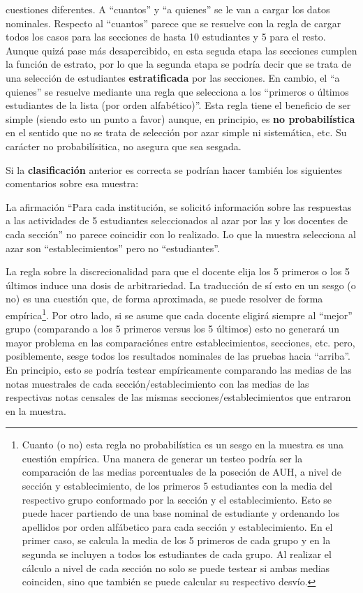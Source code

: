 \documentclass[
  spanish,
  a4paper,
]{scrreprt}
\begin{document}
\begin{itemize}
  cuestiones diferentes. A ``cuantos'' y ``a quienes'' se le van a
  cargar los datos nominales. Respecto al ``cuantos'' parece que se
  resuelve con la regla de cargar todos los casos para las secciones de
  hasta 10 estudiantes y 5 para el resto. Aunque quizá pase más
  desapercibido, en esta seguda etapa las secciones cumplen la función
  de estrato, por lo que la segunda etapa se podría decir que se trata
  de una selección de estudiantes \textbf{estratificada} por las
  secciones. En cambio, el ``a quienes'' se resuelve mediante una regla
  que selecciona a los ``primeros o últimos estudiantes de la lista (por
  orden alfabético)''. Esta regla tiene el beneficio de ser simple
  (siendo esto un punto a favor) aunque, en principio, es \textbf{no
  probabilística} en el sentido que no se trata de selección por azar
  simple ni sistemática, etc. Su carácter no probabilísitica, no asegura
  que sea sesgada.
\end{itemize}

\noindent Si la \textbf{clasificación} anterior es correcta se podrían
hacer también los siguientes comentarios sobre esa muestra:

La afirmación ``Para cada institución, se solicitó información sobre las
respuestas a las actividades de 5 estudiantes seleccionados al azar por
las y los docentes de cada sección'' no parece coincidir con lo
realizado. Lo que la muestra selecciona al azar son ``establecimientos''
pero no ``estudiantes''.

La regla sobre la discrecionalidad para que el docente elija los 5
primeros o los 5 últimos induce una dosis de arbitrariedad. La
traducción de sí esto en un sesgo (o no) es una cuestión que, de forma
aproximada, se puede resolver de forma empírica\footnote{Cuanto (o no)
  esta regla no probabilística es un sesgo en la muestra es una cuestión
  empírica. Una manera de generar un testeo podría ser la comparación de
  las medias porcentuales de la poseción de AUH, a nivel de sección y
  establecimiento, de los primeros 5 estudiantes con la media del
  respectivo grupo conformado por la sección y el establecimiento. Esto
  se puede hacer partiendo de una base nominal de estudiante y ordenando
  los apellidos por orden alfábetico para cada sección y
  establecimiento. En el primer caso, se calcula la media de los 5
  primeros de cada grupo y en la segunda se incluyen a todos los
  estudiantes de cada grupo. Al realizar el cálculo a nivel de cada
  sección no solo se puede testear si ambas medias coinciden, sino que
  también se puede calcular su respectivo desvío.}. Por otro lado, si se
asume que cada docente eligirá siempre al ``mejor'' grupo (comparando a
los 5 primeros versus los 5 últimos) esto no generará un mayor problema
en las comparaciónes entre establecimientos, secciones, etc. pero,
posiblemente, sesge todos los resultados nominales de las pruebas hacia
``arriba''. En principio, esto se podría testear empíricamente
comparando las medias de las notas muestrales de cada
sección/establecimiento con las medias de las respectivas notas censales
de las mismas secciones/establecimientos que entraron en la muestra.
\end{document}
